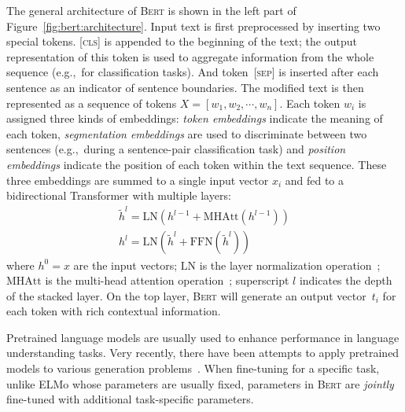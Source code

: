 \documentclass[11pt,a4paper]{article}
\begin{document}
    The general architecture of \textsc{Bert} is shown in the left part
    of Figure~\ref{fig:bert:architecture}. Input text is first
    preprocessed by inserting two special tokens.  [\textsc{cls}] is
    appended to the beginning of the text; the output representation of
    this token is used to aggregate information from the whole sequence
    (e.g.,~for classification tasks).  And token~[\textsc{sep}] is
    inserted after each sentence as an indicator of sentence boundaries.
    The modified text is then represented as a sequence of tokens
    $X=[w_1,w_2,\cdots,w_n]$. Each token $w_i$ is assigned three kinds of
    embeddings: \emph{token embeddings} indicate the meaning of each
    token, \emph{segmentation embeddings} are used to discriminate between
    two sentences (e.g.,~during a sentence-pair classification task) and
    \emph{position embeddings} indicate the position of each token within
    the text sequence.  These three embeddings are summed to a single
    input vector $x_i$ and fed to a bidirectional Transformer with
    multiple layers:
            \vspace{-0.5ex}
    \begin{gather}
    \tilde{h}^l=\mathrm{LN}(h^{l-1}+\mathrm{MHAtt}(h^{l-1}))\\
    h^l=\mathrm{LN}(\tilde{h}^l+\mathrm{FFN}(\tilde{h}^l))       
    \end{gather}    
    where $h^0=x$ are the input vectors; $\mathrm{LN}$ is the layer
    normalization operation~\cite{ba2016layer}; $\mathrm{MHAtt}$ is
    the multi-head attention operation~\cite{vaswani2017attention};
    superscript $l$ indicates the depth of the stacked layer. On the
    top layer, \textsc{Bert} will generate an output vector~$t_i$ for
    each token with rich contextual information.
    
    
    Pretrained language models are usually used to enhance performance
in language understanding tasks.  Very recently, there have been
attempts to apply pretrained models to various generation
problems~\cite{edunov2019pre,rothe2019leveraging}.  When
fine-tuning for a specific task, unlike ELMo whose parameters are
usually fixed, parameters in \textsc{Bert} are \emph{jointly}
fine-tuned with additional task-specific parameters.

    
    
\end{document}
